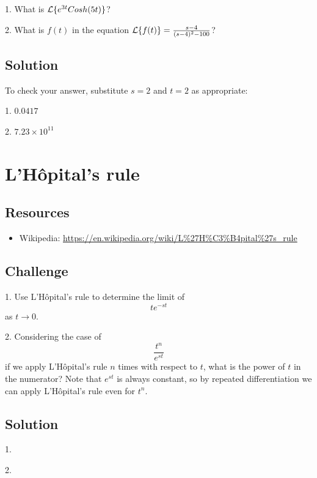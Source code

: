 1. What is $\mathcal{L}\{e^{3t} Cosh(5t)\}$?

2. What is $f(t)$ in the equation $\mathcal{L}\{f(t)\} = \frac{s-4}{(s-4)^2-100}$?

\subsection*{Solution}
To check your answer, substitute $s=2$ and $t=2$ as appropriate:

1. $0.0417$

2. $7.23 \times 10^{11}$




\newpage
\section{L'H\^opital's rule}

\subsection*{Resources}
\begin{itemize}
    \item Wikipedia: \url{https://en.wikipedia.org/wiki/L\%27H\%C3\%B4pital\%27s_rule}
\end{itemize}

\subsection*{Challenge}
1. Use L'H\^opital's rule to determine the limit of
\begin{equation}
    t e^{-st}
\end{equation}
as $t \rightarrow 0$.

2. Considering the case of
\begin{equation}
    \frac{t^n}{e^{st}}
\end{equation}
if we apply L'H\^opital's rule $n$ times with respect to $t$, what is the power of $t$ in the numerator? Note that $e^{st}$ is always constant, so by repeated differentiation we can apply L'H\^opital's rule even for $t^n$.

\subsection*{Solution}
1. 

2. 




